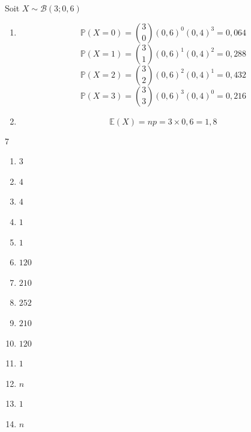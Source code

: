\documentclass[french]{book}
\begin{document}
\begin{corrige}
Soit $X \sim \mathcal{B}(3;0,6)$
\begin{enumerate}
\item $$\mathbb{P}(X=0)=\binom{3}{0}(0,6)^0(0,4)^3=0,064$$
$$\mathbb{P}(X=1)=\binom{3}{1}(0,6)^1(0,4)^2=0,288$$
$$\mathbb{P}(X=2)=\binom{3}{2}(0,6)^2(0,4)^1=0,432$$
$$\mathbb{P}(X=3)=\binom{3}{3}(0,6)^3(0,4)^0=0,216$$
\item $$\mathbb{E}(X)=np=3\times 0,6=1,8$$
\end{enumerate}
\end{corrige}

\begin{corrige}
\begin{multicols}{7}
\begin{enumerate}
\item $3$
\item $4$
\item $4$
\item $1$
\item $1$
\item $120$
\item $210$
\item $252$
\item $210$
\item $120$
\item $1$
\item $n$
\item $1$
\item $n$
\end{enumerate}
\end{multicols}
\end{corrige}
\end{document}
